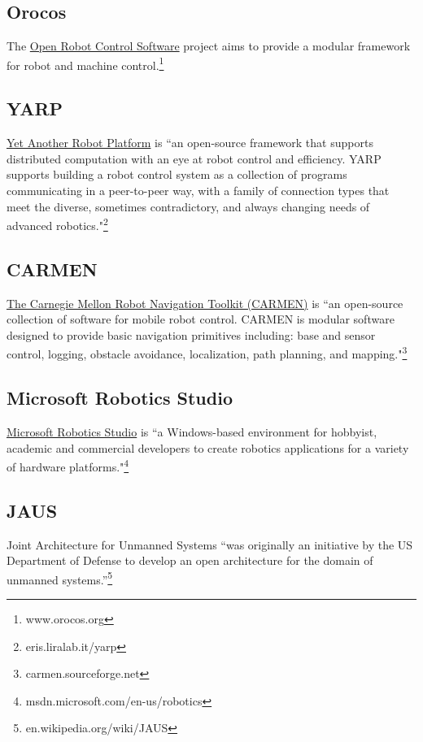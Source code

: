 \subsection{Orocos}

The \href{http://www.orocos.org/}{Open Robot Control Software} project aims to provide a modular framework for robot and machine control.\footnote{www.orocos.org}

\subsection{YARP}

\href{http://eris.liralab.it/yarp/}{Yet Another Robot Platform} is ``an open-source framework that supports distributed computation with an eye at robot control and efficiency.  YARP supports building a robot control system as a collection of programs communicating in a peer-to-peer way, with a family of connection types that meet the diverse, sometimes contradictory, and always changing needs of advanced robotics."\footnote{eris.liralab.it/yarp}

\subsection{CARMEN}

\href{http://carmen.sourceforge.net}{The Carnegie Mellon Robot Navigation Toolkit (CARMEN)} is ``an open-source collection of software for mobile robot control. CARMEN is modular software designed to provide basic navigation primitives including: base and sensor control, logging, obstacle avoidance, localization, path planning, and mapping."\footnote{carmen.sourceforge.net}

\subsection{Microsoft Robotics Studio}

\href{http://msdn.microsoft.com/en-us/robotics/default.aspx}{Microsoft Robotics Studio} is ``a Windows-based environment for hobbyist, academic and commercial developers to create robotics applications for a variety of hardware platforms."\footnote{msdn.microsoft.com/en-us/robotics}

\subsection{JAUS}

Joint Architecture for Unmanned Systems ``was originally an initiative by the US Department of Defense to develop an open architecture for the domain of unmanned systems.''\footnote{en.wikipedia.org/wiki/JAUS}

